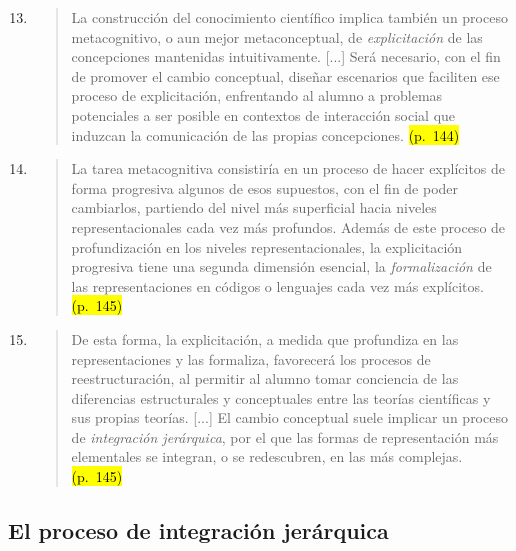\documentclass{article}
\begin{document}
\begin{enumerate}
  \setcounter{enumi}{12}

  \item
  \begin{quote}
  La construcción del conocimiento científico implica también un proceso metacognitivo, o aun mejor metaconceptual, de \textit{explicitación} de las concepciones mantenidas intuitivamente. [...] Será necesario, con el fin de promover el cambio conceptual, diseñar escenarios que faciliten ese proceso de explicitación, enfrentando al alumno a problemas potenciales a ser posible en contextos de interacción social que induzcan la comunicación de las propias concepciones. \hl{(p.~144)}
  \end{quote}

  \item
  \begin{quote}
  La tarea metacognitiva consistiría en un proceso de hacer explícitos de forma progresiva algunos de esos supuestos, con el fin de poder cambiarlos, partiendo del nivel más superficial hacia niveles representacionales cada vez más profundos. Además de este proceso de profundización en los niveles representacionales, la explicitación progresiva tiene una segunda dimensión esencial, la \textit{formalización} de las representaciones en códigos o lenguajes cada vez más explícitos. \hl{(p.~145)}
  \end{quote}

  \item
  \begin{quote}
  De esta forma, la explicitación, a medida que profundiza en las representaciones y las formaliza, favorecerá los procesos de reestructuración, al permitir al alumno tomar conciencia de las diferencias estructurales y conceptuales entre las teorías científicas y sus propias teorías. [...] El cambio conceptual suele implicar un proceso de \textit{integración jerárquica}, por el que las formas de representación más elementales se integran, o se redescubren, en las más complejas. \hl{(p.~145)}
  \end{quote}
\end{enumerate}

\subsection*{El proceso de integración jerárquica}
\end{document}
